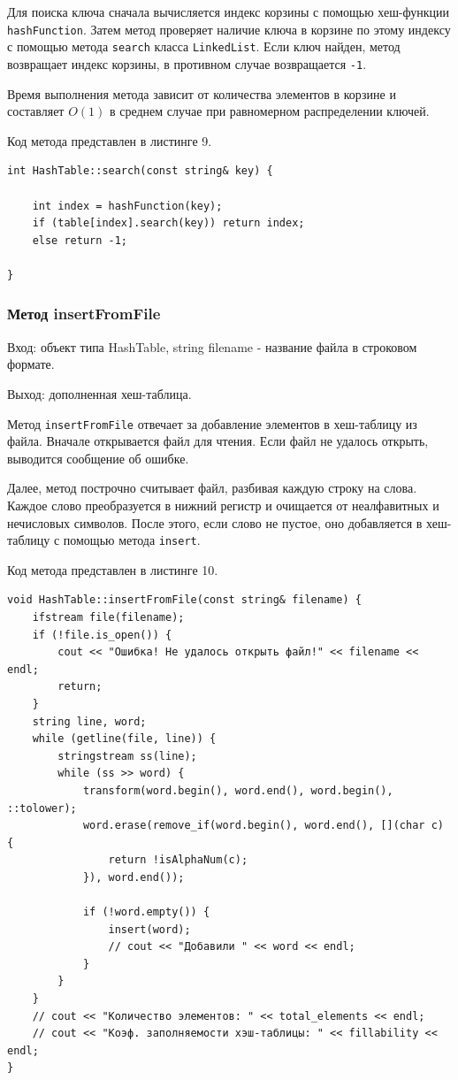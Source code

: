 \documentclass[11pt,a4paper,final]{article} %
\begin{document}
\par Для поиска ключа сначала вычисляется индекс корзины с помощью хеш-функции \texttt{hashFunction}. Затем метод проверяет наличие ключа в корзине по этому индексу с помощью метода \texttt{search} класса \texttt{LinkedList}. Если ключ найден, метод возвращает индекс корзины, в противном случае возвращается \texttt{-1}.

\par Время выполнения метода зависит от количества элементов в корзине и составляет $O(1)$ в среднем случае при равномерном распределении ключей.


Код метода представлен в листинге 9.
\begin{lstlisting}[label=find, caption = Метод find]
int HashTable::search(const string& key) {
	
	int index = hashFunction(key);
	if (table[index].search(key)) return index;
	else return -1;
	
}
\end{lstlisting}

\subsubsection{Метод insertFromFile}
Вход: объект типа HashTable, string filename - название файла в строковом формате. \par
Выход: дополненная хеш-таблица. \par

\par Метод \texttt{insertFromFile} отвечает за добавление элементов в хеш-таблицу из файла. Вначале открывается файл для чтения. Если файл не удалось открыть, выводится сообщение об ошибке.

\par Далее, метод построчно считывает файл, разбивая каждую строку на слова. Каждое слово преобразуется в нижний регистр и очищается от неалфавитных и нечисловых символов. После этого, если слово не пустое, оно добавляется в хеш-таблицу с помощью метода \texttt{insert}.

Код метода представлен в листинге 10.

\begin{lstlisting}[label=loadFromFile, caption = Метод insertFromFile]
void HashTable::insertFromFile(const string& filename) {
	ifstream file(filename);
	if (!file.is_open()) {
		cout << "Ошибка! Не удалось открыть файл!" << filename << endl;
		return;
	}
	string line, word;
	while (getline(file, line)) {
		stringstream ss(line);
		while (ss >> word) {
			transform(word.begin(), word.end(), word.begin(), ::tolower);
			word.erase(remove_if(word.begin(), word.end(), [](char c) {
				return !isAlphaNum(c);
			}), word.end());
			
			if (!word.empty()) { 
				insert(word);
				// cout << "Добавили " << word << endl;
			}
		}
	}
	// cout << "Количество элементов: " << total_elements << endl;
	// cout << "Коэф. заполняемости хэш-таблицы: " << fillability << endl;
}
\end{lstlisting}
\end{document}
